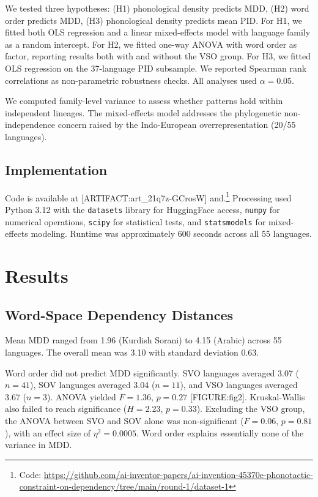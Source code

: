 \documentclass[11pt,letterpaper]{article}
\begin{document}
We tested three hypotheses: (H1) phonological density predicts MDD, (H2) word order predicts MDD, (H3) phonological density predicts mean PID. For H1, we fitted both OLS regression and a linear mixed-effects model with language family as a random intercept. For H2, we fitted one-way ANOVA with word order as factor, reporting results both with and without the VSO group. For H3, we fitted OLS regression on the 37-language PID subsample. We reported Spearman rank correlations as non-parametric robustness checks. All analyses used $\alpha = 0.05$.

We computed family-level variance to assess whether patterns hold within independent lineages. The mixed-effects model addresses the phylogenetic non-independence concern raised by the Indo-European overrepresentation (20/55 languages).

\subsection{Implementation}

Code is available at [ARTIFACT:art\_21q7z-GCrosW] and.\footnote{Code: \url{https://github.com/ai-inventor-papers/ai-invention-45370e-phonotactic-constraint-on-dependency/tree/main/round-1/dataset-1}} Processing used Python 3.12 with the \texttt{datasets} library for HuggingFace access, \texttt{numpy} for numerical operations, \texttt{scipy} for statistical tests, and \texttt{statsmodels} for mixed-effects modeling. Runtime was approximately 600 seconds across all 55 languages.

\section{Results}

\subsection{Word-Space Dependency Distances}

Mean MDD ranged from 1.96 (Kurdish Sorani) to 4.15 (Arabic) across 55 languages. The overall mean was 3.10 with standard deviation 0.63.

Word order did not predict MDD significantly. SVO languages averaged 3.07 ($n = 41$), SOV languages averaged 3.04 ($n = 11$), and VSO languages averaged 3.67 ($n = 3$). ANOVA yielded $F = 1.36$, $p = 0.27$ [FIGURE:fig2]. Kruskal-Wallis also failed to reach significance ($H = 2.23$, $p = 0.33$). Excluding the VSO group, the ANOVA between SVO and SOV alone was non-significant ($F = 0.06$, $p = 0.81$), with an effect size of $\eta^2 = 0.0005$. Word order explains essentially none of the variance in MDD.
\end{document}
